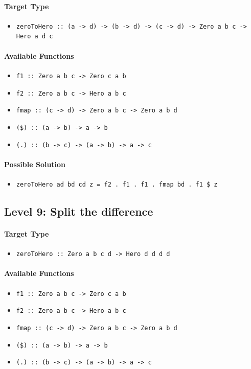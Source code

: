 \documentclass[preprint,12pt]{elsarticle}
\begin{document}
\paragraph{Target Type } 
\begin{itemize}
    \item \texttt{zeroToHero :: (a -> d) -> (b -> d) -> (c -> d) -> Zero a b c ->  Hero a d c}
\end{itemize}

\paragraph{Available Functions} 
\begin{itemize}
    \item \texttt{f1 :: Zero a b c -> Zero c a b}
    \item \texttt{f2 :: Zero a b c -> Hero a b c}
    \item \texttt{fmap :: (c -> d) -> Zero a b c -> Zero a b d}
    \item \texttt{(\$) :: (a -> b) -> a -> b}
    \item \texttt{(.) :: (b -> c) -> (a -> b) -> a -> c}
\end{itemize}

\paragraph{Possible Solution} 
\begin{itemize}
    \item \texttt{zeroToHero ad bd cd z = f2  . f1  . f1  . fmap bd  . f1 \$ z}
\end{itemize}

\subsection{Level 9: Split the difference}
\paragraph{Target Type } 
\begin{itemize}
    \item \texttt{zeroToHero :: Zero a b c d ->  Hero d d d d}
\end{itemize}

\paragraph{Available Functions} 
\begin{itemize}
    \item \texttt{f1 :: Zero a b c -> Zero c a b}
    \item \texttt{f2 :: Zero a b c -> Hero a b c}
    \item \texttt{fmap :: (c -> d) -> Zero a b c -> Zero a b d}
    \item \texttt{(\$) :: (a -> b) -> a -> b}
    \item \texttt{(.) :: (b -> c) -> (a -> b) -> a -> c}
\end{itemize}
\end{document}
